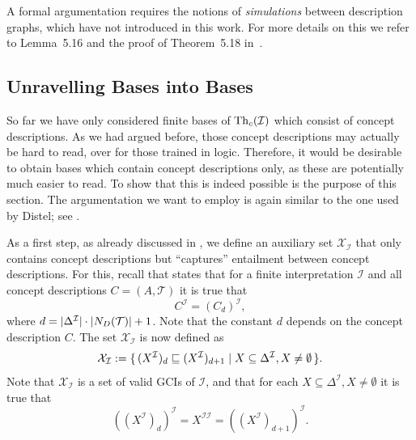 A formal argumentation requires the notions of \emph{simulations} between \EL description
graphs, which have not introduced in this work.  For more details on this we refer to
Lemma~5.16 and the proof of Theorem~5.18 in~\cite{Diss-Felix}.

\subsection{Unravelling \ELgfpbot Bases into \ELbot Bases}
\label{sec:unrav-elgfpb-bases}

So far we have only considered finite bases of $\operatorname{Th}_c(\mathcal{I})$ which consist of
\ELgfpbot concept descriptions.  As we had argued before, those concept descriptions may
actually be hard to read, over for those trained in logic.  Therefore, it would be
desirable to obtain bases which contain \ELbot concept descriptions only, as these are
potentially much easier to read.  To show that this is indeed possible is the purpose of
this section.  The argumentation we want to employ is again similar to the one used by
Distel; see .

As a first step, as already discussed in , we define an auxiliary
set $\mathcal{X}_{\mathcal{I}}$ that only contains \ELbot concept descriptions but
``captures'' entailment between \ELgfpbot concept descriptions.  For this, recall that
 states that for a finite interpretation $\mathcal{I}$ and all
\ELgfpbot concept descriptions $C = (A, \mathcal{T})$ it is true that
\begin{equation*}
  C^{\mathcal{I}} = (C_d)^{\mathcal{I}},
\end{equation*}
where $d = \lvert \Delta^{\mathcal{I}} \rvert \cdot \lvert N_D(\mathcal{T}) \rvert + 1$.  Note that
the constant $d$ depends on the concept description $C$.  The set
$\mathcal{X}_{\mathcal{I}}$ is now defined as
\begin{equation*}
  \mathcal{X}_{\mathcal{I}} := {\{\, (X^{\mathcal{I}})_d \sqsubseteq
    (X^{\mathcal{I}})_{d+1} \mid X \subseteq \Delta^{\mathcal{I}}, X \neq \emptyset \,\}}.
\end{equation*}
Note that $\mathcal{X}_{\mathcal{I}}$ is a set of valid GCIs of $\mathcal{I}$, and that
for each $X \subseteq \Delta^{\mathcal{I}}, X \neq \emptyset$ it is true that
\begin{equation*}
  ((X^{\mathcal{I}})_d)^{\mathcal{I}} = X^{\mathcal{I}\mathcal{I}} = ((X^{\mathcal{I}})_{d+1})^{\mathcal{I}}.
\end{equation*}

